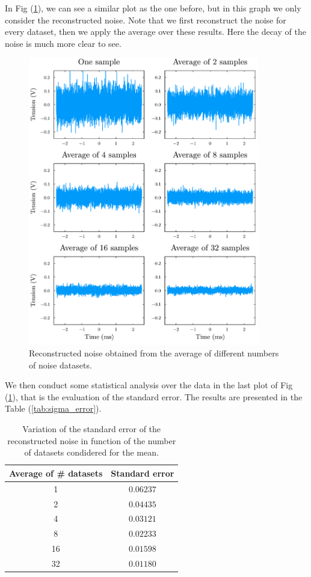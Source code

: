 \documentclass[a4paper,12pt]{article}
\begin{document}
\par In Fig (\ref{plot:Noise_decay_only_noise}), we can see a similar plot as the one before, 
but in this graph we only consider the reconstructed noise. Note that we first reconstruct the 
noise for every dataset, then we apply the average over these results. Here the decay of the noise 
is much more clear to see. 
\begin{figure}[H]
    \centering
    \includegraphics[width=0.9\textwidth]{Error_fix.pdf}
    \caption{Reconstructed noise obtained from the average of different numbers of noise datasets.}
    \label{plot:Noise_decay_only_noise}
\end{figure}

\par We then conduct some statistical analysis over the data in the last plot of 
Fig (\ref{plot:Noise_decay_only_noise}), that is the evaluation of the standard error.
The results are presented in the Table (\ref{tab:sigma_error}).

\begin{table}[h]
    \centering
    \begin{tabular}{|c|c|}
        \hline
        Average of \# datasets & Standard error \\
        \hline
        1 & $0.06237$ \\
        2 & $0.04435$ \\
        4 & $0.03121$ \\
        8 & $0.02233$ \\
        16 & $0.01598$ \\
        32 & $0.01180$ \\
        \hline
    \end{tabular}
    \caption{Variation of the standard error of the reconstructed noise in function of the number of datasets condidered for the mean.}
    \label{tab:summary_table}
\end{table}
\end{document}
